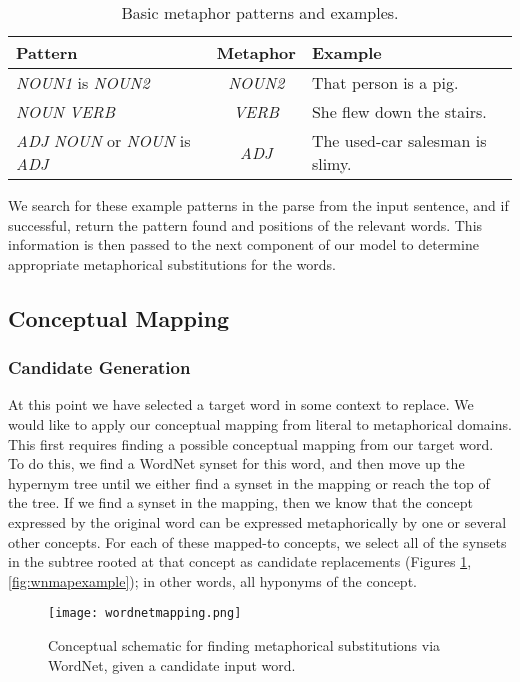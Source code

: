 \documentclass[12pt]{article}
\begin{document}
\begin{table}[h]
	\centering
	\small
	\begin{tabular}{|l|c|l|} \hline
		\textbf{Pattern} & \textbf{Metaphor} & \textbf{Example}\\	\hline
		\emph{NOUN1} is \emph{NOUN2} & \emph{NOUN2} & That person is a pig.\\ \hline
		\emph{NOUN} \emph{VERB} & \emph{VERB} & She flew down the stairs.\\ \hline
		\emph{ADJ} \emph{NOUN} or \emph{NOUN} is \emph{ADJ} & \emph{ADJ} & The used-car salesman is slimy.\\ \hline
	\end{tabular}
	\caption{Basic metaphor patterns and examples.}
	\label{tab:metaphorexamples}
\end{table}

We search for these example patterns in the parse from the input sentence, and if successful, return the pattern found and positions of the relevant words.  This information is then passed to the next component of our model to determine appropriate metaphorical substitutions for the words.

\subsection{Conceptual Mapping}

\subsubsection{Candidate Generation}

At this point we have selected a target word in some context to replace. We would like to apply our conceptual mapping from literal to metaphorical domains. This first requires finding a possible conceptual mapping from our target word. To do this, we find a WordNet synset for this word, and then move up the hypernym tree until we either find a synset in the mapping or reach the top of the tree. If we find a synset in the mapping, then we know that the concept expressed by the original word can be expressed metaphorically by one or several other concepts. For each of these mapped-to concepts, we select all of the synsets in the subtree rooted at that concept as candidate replacements (Figures \ref{fig:wnmapping}, \ref{fig:wnmapexample}); in other words, all hyponyms of the concept.

\begin{figure}[h]
	\centering
	\texttt{[image: wordnetmapping.png]}
	\caption{Conceptual schematic for finding metaphorical substitutions via WordNet, given a candidate input word.}
	\label{fig:wnmapping}
\end{figure}
\end{document}
